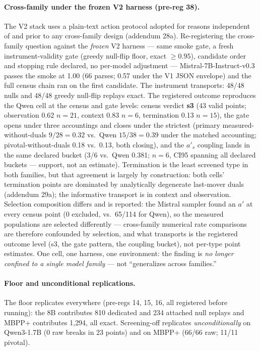 \documentclass{article}
\theoremstyle{remark}
\begin{document}
\paragraph{Cross-family under the frozen V2 harness (pre-reg 38).} The V2
stack uses a plain-text action protocol adopted for reasons independent
of and prior to any cross-family design (addendum 28a). Re-registering
the cross-family question against the \emph{frozen} V2 harness --- same
smoke gate, a fresh instrument-validity gate (greedy null-flip floor,
exact $\geq 0.95$), candidate order and stopping rule declared, no
per-model adjustment --- Mistral-7B-Instruct-v0.3 passes the smoke at
1.00 (66 parses; 0.57 under the V1 JSON envelope) and the full census
chain ran on the first candidate. The instrument transports: 48/48 nulls
and 48/48 greedy null-flip replays exact. The registered outcome
reproduces the Qwen cell at the census and gate levels: census verdict
\textbf{s3} (43 valid points; observation 0.62 $n{=}21$, context 0.83
$n{=}6$, termination 0.13 $n{=}15$), the gate opens under three
accountings and closes under
the strictest (primary measured-without-duals $9/28 = 0.32$ vs.\ Qwen
$15/38 = 0.39$ under the matched accounting; pivotal-without-duals 0.18 vs.\ 0.13, both closing), and the
$a'_s$ coupling lands in the same declared bucket (3/6 vs.\ Qwen
0.381; $n{=}6$, CI95 spanning all declared buckets --- support, not an
estimate). Termination is the least screened type in both families, but
that agreement is largely by construction: both cells' termination
points are dominated by analytically degenerate last-mover duals
(addendum 29a); the informative transport is in context and
observation. Selection composition
differs and is reported: the Mistral sampler found an $a'$ at every
census point (0 excluded, vs.\ 65/114 for Qwen), so the measured
populations are selected differently --- cross-family numerical rate
comparisons are therefore confounded by selection, and what transports
is the registered outcome level (s3, the gate pattern, the coupling
bucket), not per-type point estimates. One cell, one harness, one
environment: the finding is \emph{no longer confined to a single model
family} --- not ``generalizes across families.''
\paragraph{Floor and unconditional replications.} The floor
replicates everywhere (pre-regs 14, 15, 16, all registered before running): the
8B contributes 810 dedicated and 234 attached null replays and MBPP+
contributes 1{,}294, all exact. Screening-off replicates
\emph{unconditionally} on Qwen3-1.7B (0 raw breaks in 23 points) and on
MBPP+ (66/66 raw; 11/11 pivotal).
\end{document}
